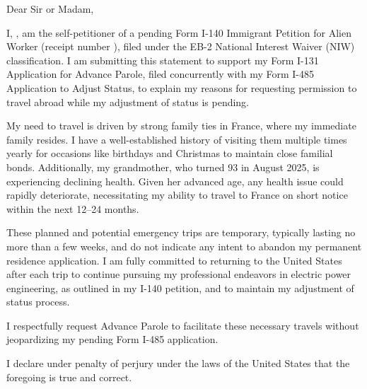 \setcounter{page}{1}
\pagestyle{fancy}
\fancyhf{}
\rhead{\myFirstName {} \myLastName}

\myAddress

\USCISaddress


Dear Sir or Madam,

I, \myFirstName {} \myLastName, am the self-petitioner of a pending Form I-140 Immigrant Petition for Alien Worker (receipt number \myEBcase), filed under the EB-2 National Interest Waiver (NIW) classification. I am submitting this statement to support my Form I-131 Application for Advance Parole, filed concurrently with my Form I-485 Application to Adjust Status, to explain my reasons for requesting permission to travel abroad while my adjustment of status is pending.

My need to travel is driven by strong family ties in France, where my immediate family resides. I have a well-established history of visiting them multiple times yearly for occasions like birthdays and Christmas to maintain close familial bonds. Additionally, my grandmother, who turned 93 in August 2025, is experiencing declining health. Given her advanced age, any health issue could rapidly deteriorate, necessitating my ability to travel to France on short notice within the next 12–24 months.

These planned and potential emergency trips are temporary, typically lasting no more than a few weeks, and do not indicate any intent to abandon my permanent residence application. I am fully committed to returning to the United States after each trip to continue pursuing my professional endeavors in electric power engineering, as outlined in my I-140 petition, and to maintain my adjustment of status process.

I respectfully request Advance Parole to facilitate these necessary travels without jeopardizing my pending Form I-485 application.

I declare under penalty of perjury under the laws of the United States that the foregoing is true and correct.

\label{endOfTravelStatement}
\clearpage
\pagestyle{empty}